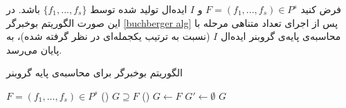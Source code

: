 \begin{theorem}
فرض کنید 
$F = (f_{1},...,f_{s})\in P^{s}$
و
$I$
ایده‌ال تولید شده توسط 
$\{f_{1},...,f_{s}\}$
باشد. در این صورت الگوریتم بوخبرگر 
\ref{buchberger alg}
پس از اجرای تعداد متناهی مرحله با محاسبه‌ی پایه‌ی گروبنر ایده‌ال 
$I$
(نسبت به ترتیب یکجمله‌ای در نظر گرفته شده)، به پایان می‌رسد.
\begin{algorithm}[]
	\caption{الگوریتم بوخبرگر برای محاسبه‌ی پایه‌ گروبنر}
	\label{buchberger alg}
	\begin{latin}
		\begin{algorithmic}[]		
			\REQUIRE  $F = (f_{1},...,f_{s})\in P^{s}$ 
			{\small ()}
			\ENSURE  $G\supseteq F$
			{\small () }
			\STATE $G\gets F$
			\STATE $G'\gets \emptyset$
              \ENDIF
             \ENDIF
            \ENDFOR
			\ENDWHILE
			\RETURN  $G$
		\end{algorithmic}
	\end{latin}
\end{algorithm}


\end{theorem}

